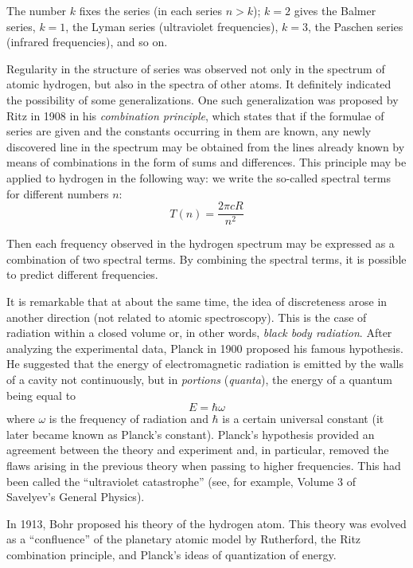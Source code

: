 \documentclass[a4paper,sfsidenotes,colorlinks=true]{tufte-book}
\numberwithin{equation}{section}
\numberwithin{figure}{section}
\begin{document}
The number $k$ fixes the series (in each series $n > k$); $k = 2$
gives the Balmer series, $k = 1$, the Lyman series (ultraviolet
frequencies), $k = 3$, the Paschen series (infrared frequencies), and
so on.  

Regularity in the structure of series was observed not only in the
spectrum of atomic hydrogen, but also in the spectra of other
atoms. It definitely indicated the possibility of some
generalizations. One such generalization was proposed by Ritz in 1908
in his \emph{combination principle}, which states that if the formulae of
series are given and the constants occurring in them are known, any
newly discovered line in the spectrum may be obtained from the lines
already known by means of combinations in the form of sums and
differences. This principle may be applied to hydrogen in the
following way: we write the so-called spectral terms for different
numbers $n$: 
\begin{equation*}
T(n) = \frac{2 \pi c R}{n^{2}} 
\end{equation*}

Then each frequency observed in the hydrogen spectrum may be expressed
as a combination of two spectral terms. By combining the spectral
terms, it is possible to predict different frequencies. 

It is remarkable that at about the same time, the idea of discreteness
arose in another direction (not related to atomic spectroscopy). This
is the case of radiation within a closed volume or, in other words,
\emph{black body radiation}. After analyzing the experimental data, Planck in
1900 proposed his famous hypothesis. He suggested that the energy of
electromagnetic radiation is emitted by the walls of a cavity not
continuously, but in \emph{portions} (\emph{quanta}), the energy of a
quantum being equal to 
\begin{equation}%
E = \hbar \omega 
\label{eq-2.3}
\end{equation}
where $\omega$ is the frequency of radiation and $\hbar$
is a certain universal constant (it later became known as Planck's
constant). Planck's hypothesis provided an agreement between the
theory and experiment and, in particular, removed the flaws arising in
the previous theory when passing to higher frequencies. This had been
called the ``ultraviolet catastrophe'' (see, for example, Volume 3 of
Savelyev's General Physics). \cite[-1cm]{savelyev-1980}

In 1913, Bohr proposed his theory of the hydrogen atom. This
theory was evolved as a ``confluence'' of the planetary atomic model
by Rutherford, the Ritz combination principle, and Planck's ideas of
quantization of energy.
\end{document}
